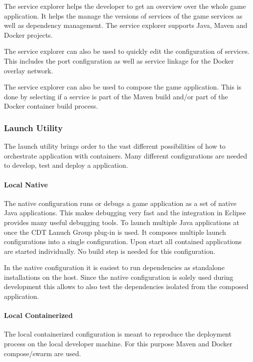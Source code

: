 The service explorer helps the developer to get an overview over the whole
game application. It helps the manage the versions of services of the game
services as well as dependency management. The service explorer supports Java,
Maven and Docker projects.

The service explorer can also be used to quickly edit the configuration of
services. This includes the port configuration as well as service linkage for
the Docker overlay network.

The service explorer can also be used to compose the game application. This is
done by selecting if a service is part of the Maven build and/or part of the
Docker container build process.

\subsubsection{Launch Utility}

The launch utility brings order to the vast different possibilities of how to
orchestrate \ms{} application with containers. Many different configurations are
needed to develop, test and deploy a \ms{} application.

\paragraph{Local Native}

The native configuration runs or debugs a game application as a set of native
Java applications. This makes debugging very fast and the integration in Eclipse
provides many useful debugging tools. To launch multiple Java applications at
once the CDT Lanuch Group plug-in is used. It composes multiple launch
configurations into a single configuration. Upon start all contained
applications are started individually. No build step is needed for this
configuration.

In the native configuration it is easiest to run dependencies as standalone
installations on the host. Since the native configuration is solely used during
development this allows to also test the dependencies isolated from the composed
application.

\paragraph{Local Containerized}

The local containerized configuration is meant to reproduce the deployment
process on the local developer machine. For this purpose Maven and Docker
compose/swarm are used. 

